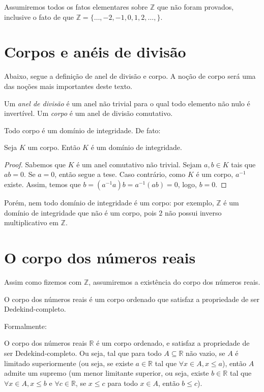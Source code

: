 Assumiremos todos os fatos elementares sobre $\mathbb Z$ que não foram provados, inclusive o fato de que $\mathbb Z=\{\dots, -2, -1, 0, 1, 2, \dots, \}$.
\section{Corpos e anéis de divisão}

Abaixo, segue a definição de anel de divisão e corpo.
A noção de corpo será uma das noções mais importantes deste texto.
\begin{definition}
Um \emph{anel de divisão} é um anel não trivial para o qual todo elemento não nulo é invertível.
Um \emph{corpo} é um anel de divisão comutativo.
\end{definition}

Todo corpo é um domínio de integridade.
De fato:
\begin{prop}
    Seja $K$ um corpo.
    Então $K$ é um domínio de integridade.
\end{prop}
\begin{proof}
Sabemos que $K$ é um anel comutativo não trivial.
Sejam $a, b \in K$ tais que $ab=0$.
Se $a=0$, então segue a tese.
Caso contrário, como $K$ é um corpo, $a^{-1}$ existe.
Assim, temos que $b=(a^{-1}a)b=a^{-1}(ab)=0$, logo, $b=0$.
\end{proof}

Porém, nem todo domínio de integridade é um corpo: por exemplo, $\mathbb Z$ é um domínio de integridade que não é um corpo, pois $2$ não possui inverso multiplicativo em $\mathbb Z$.

\section{O corpo dos números reais}
Assim como fizemos com $\mathbb Z$, assumiremos a existência do corpo dos números reais.

O corpo dos números reais é um corpo ordenado que satisfaz a propriedade de ser Dedekind-completo.

Formalmente:

\begin{prop}
    O corpo dos números reais $\mathbb R$ é um corpo ordenado, e satisfaz a propriedade de ser Dedekind-completo.
    Ou seja, tal que para todo $A\subseteq \mathbb R$ não vazio, se $A$ é limitado superiormente (ou seja, se existe $a \in \mathbb R$ tal que $\forall x \in A, x\leq a$), então $A$ admite um supremo (um menor limitante superior, ou seja, existe $b \in \mathbb R$ tal que $\forall x \in A, x\leq b$ e $\forall c \in \mathbb R$, se $x\leq c$ para todo $x\in A$, então $b\leq c$).
\end{prop}


